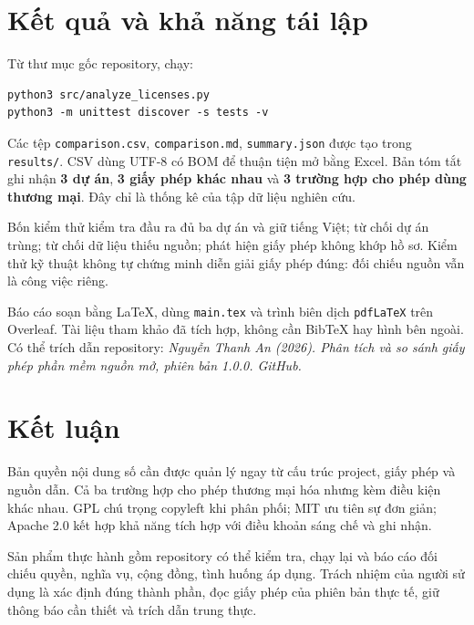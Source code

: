 \documentclass[12pt,a4paper]{article}
\begin{document}
\section{Kết quả và khả năng tái lập}
Từ thư mục gốc repository, chạy:
\begin{verbatim}
python3 src/analyze_licenses.py
python3 -m unittest discover -s tests -v
\end{verbatim}
Các tệp \texttt{comparison.csv}, \texttt{comparison.md}, \texttt{summary.json} được tạo trong \texttt{results/}. CSV dùng UTF-8 có BOM để thuận tiện mở bằng Excel. Bản tóm tắt ghi nhận \textbf{3 dự án}, \textbf{3 giấy phép khác nhau} và \textbf{3 trường hợp cho phép dùng thương mại}. Đây chỉ là thống kê của tập dữ liệu nghiên cứu.

Bốn kiểm thử kiểm tra đầu ra đủ ba dự án và giữ tiếng Việt; từ chối dự án trùng; từ chối dữ liệu thiếu nguồn; phát hiện giấy phép không khớp hồ sơ. Kiểm thử kỹ thuật không tự chứng minh diễn giải giấy phép đúng: đối chiếu nguồn vẫn là công việc riêng.

Báo cáo soạn bằng LaTeX, dùng \texttt{main.tex} và trình biên dịch \texttt{pdfLaTeX} trên Overleaf. Tài liệu tham khảo đã tích hợp, không cần BibTeX hay hình bên ngoài. Có thể trích dẫn repository: \textit{Nguyễn Thanh An (2026). Phân tích và so sánh giấy phép phần mềm nguồn mở, phiên bản 1.0.0. GitHub.}

\section{Kết luận}
Bản quyền nội dung số cần được quản lý ngay từ cấu trúc project, giấy phép và nguồn dẫn. Cả ba trường hợp cho phép thương mại hóa nhưng kèm điều kiện khác nhau. GPL chú trọng copyleft khi phân phối; MIT ưu tiên sự đơn giản; Apache 2.0 kết hợp khả năng tích hợp với điều khoản sáng chế và ghi nhận.

Sản phẩm thực hành gồm repository có thể kiểm tra, chạy lại và báo cáo đối chiếu quyền, nghĩa vụ, cộng đồng, tình huống áp dụng. Trách nhiệm của người sử dụng là xác định đúng thành phần, đọc giấy phép của phiên bản thực tế, giữ thông báo cần thiết và trích dẫn trung thực.
\end{document}
